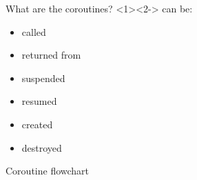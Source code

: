 \documentclass[10pt]{beamer}
\begin{document}
\begin{frame}{What are the coroutines?}
	\alert{<2->} can be:
	\begin{itemize}
		\item called
		\item returned from
		\item<2-|alert@2> \alert<+>{suspended}
		\item<3-|alert@3> resumed
		\item<4-|alert@4> created
		\item<5-|alert@5> destroyed
	\end{itemize}
\end{frame}

\begin{frame}{Coroutine flowchart}

\begin{columns}
\end{columns}
\end{frame}
\end{document}
